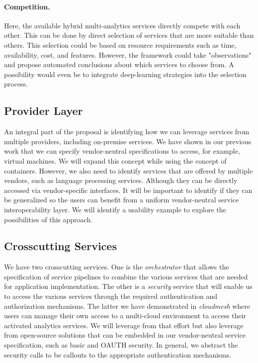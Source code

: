 \paragraph{Competition.} Here, the available hybrid multi-analytics services
directly compete with each other. This can be done by direct selection
of services that are more suitable than others. This selection could
be based on resource requirements such as time, availability, cost,
and features. However, the framework could take "observations" and
propose automated conclusions about which services to choose from. A
possibility would even be to integrate deep-learning strategies into
the selection process.
  

\subsection{Provider Layer}

An integral part of the proposal is identifying how we can leverage
services from multiple providers, including on-premise services. We
have shown in our previous work that we can specify vendor-neutral
specifications to access, for example, virtual machines. We will expand
this concept while using the concept of containers. However, we also
need to identify services that are offered by
multiple vendors, such as language processing services. Although they
can be directly accessed via vendor-specific interfaces. It will
be important to identify if they can be generalized so the users
can benefit from a uniform vendor-neutral service interoperability
layer. We will identify a usability example to explore the
possibilities of this approach.

\subsection{Crosscutting Services}

We have two crosscutting services. One is the {\em orchestrator} that
allows the specification of service pipelines to combine the various
services that are needed for application implementation. The other
is a {\em security} service that will enable us to access the various services
through the required authentication and authorization mechanisms. The
latter we have demonstrated in {\em cloudmesh} where users can manage their
own access to a multi-cloud environment ta access their activated
analytics services. We will leverage from that effort but  also leverage from
open-source solutions that can be embedded in our vendor-neutral
service specification, such as basic and OAUTH security. In general, we
abstract the security calls to be callouts to the appropriate
authentication mechanisms.

